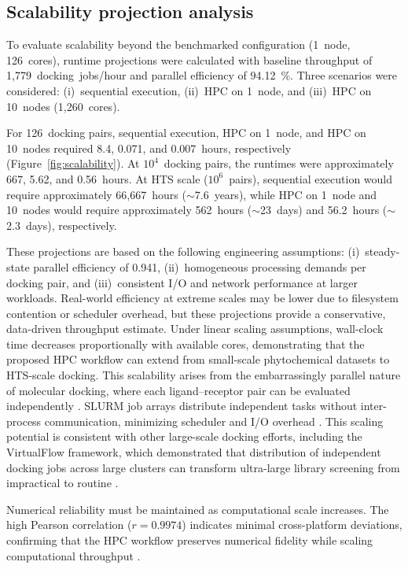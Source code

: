\documentclass[11pt,a4paper]{article}
\begin{document}
\subsection{Scalability projection analysis}

To evaluate scalability beyond the benchmarked configuration (1~node, 126~cores), runtime projections were calculated with baseline throughput of 1,779~docking~jobs/hour and parallel efficiency of \SI{94.12}{\percent}. Three scenarios were considered: (i)~sequential execution, (ii)~HPC on 1~node, and (iii)~HPC on 10~nodes (1,260~cores).

For 126~docking pairs, sequential execution, HPC on 1~node, and HPC on 10~nodes required 8.4, 0.071, and \SI{0.007}{hours}, respectively (Figure~\ref{fig:scalability}). At $10^4$~docking pairs, the runtimes were approximately 667, 5.62, and \SI{0.56}{hours}. At HTS scale ($10^6$~pairs), sequential execution would require approximately 66,667~hours ($\sim$7.6~years), while HPC on 1~node and 10~nodes would require approximately 562~hours ($\sim$23~days) and 56.2~hours ($\sim$2.3~days), respectively.

These projections are based on the following engineering assumptions: (i)~steady-state parallel efficiency of 0.941, (ii)~homogeneous processing demands per docking pair, and (iii)~consistent I/O and network performance at larger workloads. Real-world efficiency at extreme scales may be lower due to filesystem contention or scheduler overhead, but these projections provide a conservative, data-driven throughput estimate. Under linear scaling assumptions, wall-clock time decreases proportionally with available cores, demonstrating that the proposed HPC workflow can extend from small-scale phytochemical datasets to HTS-scale docking. This scalability arises from the embarrassingly parallel nature of molecular docking, where each ligand--receptor pair can be evaluated independently \cite{darme2021}. SLURM job arrays distribute independent tasks without inter-process communication, minimizing scheduler and I/O overhead \cite{curia2024,simakov2018}. This scaling potential is consistent with other large-scale docking efforts, including the VirtualFlow framework, which demonstrated that distribution of independent docking jobs across large clusters can transform ultra-large library screening from impractical to routine \cite{gorgulla2020,lyu2019,eisenhuth2025}.

Numerical reliability must be maintained as computational scale increases. The high Pearson correlation ($r = 0.9974$) indicates minimal cross-platform deviations, confirming that the HPC workflow preserves numerical fidelity while scaling computational throughput \cite{lyu2019}.
\end{document}

